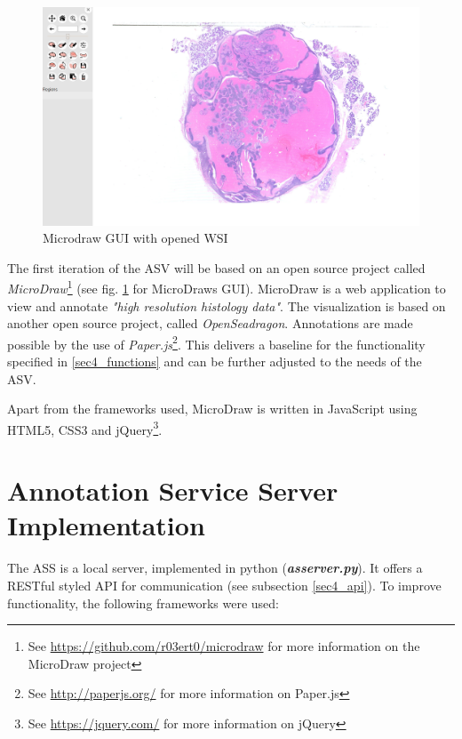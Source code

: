 \begin{figure}[H]
	\begin{center}
		\includegraphics[scale=0.2]{img/microdrawUI.png}
		\caption{Microdraw GUI with opened WSI}
		\label{fig4_microdrawUI}
	\end{center}
\end{figure}

The first iteration of the ASV will be based on an open source project called \emph{MicroDraw}\footnote{See \url{https://github.com/r03ert0/microdraw} for more information on the MicroDraw project} (see fig. \ref{fig4_microdrawUI} for MicroDraws GUI).  MicroDraw is a web application to view and annotate \emph{"high resolution histology data"}\cite{web:microdraw2}. The visualization is based on another open source project, called \emph{OpenSeadragon}\cite{web:openseadragon}. Annotations are made possible by the use of \emph{Paper.js}\footnote{See \url{http://paperjs.org/} for more information on Paper.js}. This delivers a baseline for the functionality specified in \ref{sec4_functions} and can be further adjusted to the needs of the ASV.

Apart from the frameworks used, MicroDraw is written in JavaScript using HTML5, CSS3 and jQuery\footnote{See \url{https://jquery.com/} for more information on jQuery}.

\section{Annotation Service Server Implementation}
The ASS is a local server, implemented in python (\emph{\textbf{as{\textunderscore}server.py}}). It offers a RESTful styled API for communication (see subsection \ref{sec4_api}). To improve functionality, the following frameworks were used:

